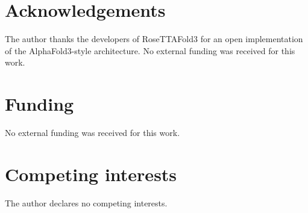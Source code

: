 \documentclass[11pt]{article}
\begin{document}
\section*{Acknowledgements}
The author thanks the developers of RoseTTAFold3 for an open implementation
of the AlphaFold3-style architecture. No external funding was received for
this work.

\section*{Funding}
No external funding was received for this work.

\section*{Competing interests}
The author declares no competing interests.
\end{document}
